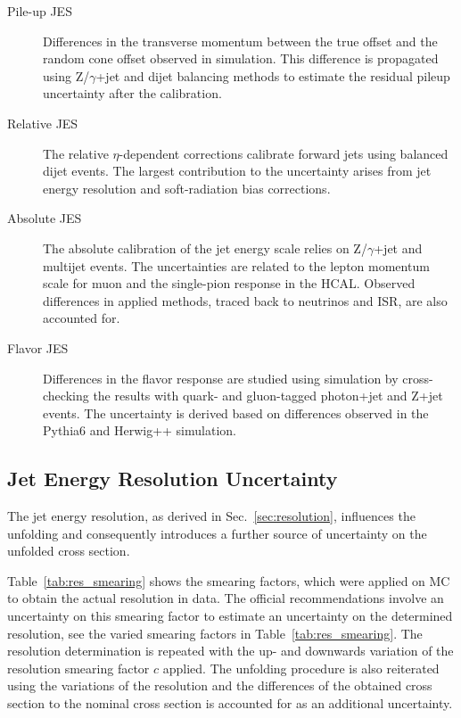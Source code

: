 \begin{description}
    \item[Pile-up JES] Differences in the transverse momentum between the true
        offset and the random cone offset observed in simulation. This
        difference is propagated using Z/$\gamma$+jet and dijet balancing
        methods to estimate the residual pileup uncertainty after the
        calibration.
    \item[Relative JES] The relative $\eta$-dependent corrections calibrate
        forward jets using balanced dijet events. The largest contribution to
        the uncertainty arises from jet energy resolution and soft-radiation
        bias corrections. 
    \item[Absolute JES]  The absolute calibration of the jet energy scale relies
        on Z/$\gamma$+jet and multijet events. The uncertainties are related to
        the lepton momentum scale for muon and the single-pion response in the
        HCAL. Observed differences in applied methods, traced back to neutrinos
        and ISR, are also accounted for. 
    \item[Flavor JES] Differences in the flavor response are studied using
        simulation by cross-checking the results with quark- and gluon-tagged
        photon+jet and Z+jet events. The uncertainty is derived based on
        differences observed in the Pythia6 and Herwig++ simulation.
\end{description}

\subsection{Jet Energy Resolution Uncertainty}

The jet energy resolution, as derived in Sec.~\ref{sec:resolution}, influences
the unfolding and consequently introduces a further source of uncertainty on the
unfolded cross section. 

Table~\ref{tab:res_smearing} shows the smearing factors, which were applied on
MC to obtain the actual resolution in data. The official recommendations involve
an uncertainty on this smearing factor to estimate an uncertainty on the
determined resolution, see the varied smearing factors in
Table~\ref{tab:res_smearing}. The resolution determination is repeated with the
up- and downwards variation of the resolution smearing factor $c$ applied. The
unfolding procedure is also reiterated using the variations of the resolution
and the differences of the obtained cross section to the nominal cross section
is accounted for as an additional uncertainty. 

